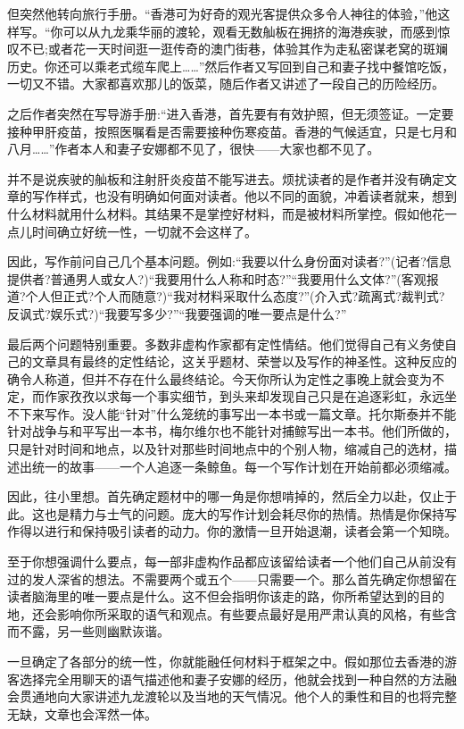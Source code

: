 但突然他转向旅行手册。“香港可为好奇的观光客提供众多令人神往的体验，”他这样写。“你可以从九龙乘华丽的渡轮，观看无数舢板在拥挤的海港疾驶，而感到惊叹不已;或者花一天时间逛一逛传奇的澳门街巷，体验其作为走私密谋老窝的斑斓历史。你还可以乘老式缆车爬上……”然后作者又写回到自己和妻子找中餐馆吃饭，一切又不错。大家都喜欢那儿的饭菜，随后作者又讲述了一段自己的历险经历。

之后作者突然在写导游手册:“进入香港，首先要有有效护照，但无须签证。一定要接种甲肝疫苗，按照医嘱看是否需要接种伤寒疫苗。香港的气候适宜，只是七月和八月……”作者本人和妻子安娜都不见了，很快——大家也都不见了。

并不是说疾驶的舢板和注射肝炎疫苗不能写进去。烦扰读者的是作者并没有确定文章的写作样式，也没有明确如何面对读者。他以不同的面貌，冲着读者就来，想到什么材料就用什么材料。其结果不是掌控好材料，而是被材料所掌控。假如他花一点儿时间确立好统一性，一切就不会这样了。

因此，写作前问自己几个基本问题。例如:“我要以什么身份面对读者?”(记者?信息提供者?普通男人或女人?)“我要用什么人称和时态?”“我要用什么文体?”(客观报道?个人但正式?个人而随意?)“我对材料采取什么态度?”(介入式?疏离式?裁判式?反讽式?娱乐式?)“我要写多少?”“我要强调的唯一要点是什么?”

最后两个问题特别重要。多数非虚构作家都有定性情结。他们觉得自己有义务使自己的文章具有最终的定性结论，这关乎题材、荣誉以及写作的神圣性。这种反应的确令人称道，但并不存在什么最终结论。今天你所认为定性之事晚上就会变为不定，而作家孜孜以求每一个事实细节，到头来却发现自己只是在追逐彩虹，永远坐不下来写作。没人能“针对”什么笼统的事写出一本书或一篇文章。托尔斯泰并不能针对战争与和平写出一本书，梅尔维尔也不能针对捕鲸写出一本书。他们所做的，只是针对时间和地点，以及针对那些时间地点中的个别人物，缩减自己的选材，描述出统一的故事——一个人追逐一条鲸鱼。每一个写作计划在开始前都必须缩减。

因此，往小里想。首先确定题材中的哪一角是你想啃掉的，然后全力以赴，仅止于此。这也是精力与士气的问题。庞大的写作计划会耗尽你的热情。热情是你保持写作得以进行和保持吸引读者的动力。你的激情一旦开始退潮，读者会第一个知晓。

至于你想强调什么要点，每一部非虚构作品都应该留给读者一个他们自己从前没有过的发人深省的想法。不需要两个或五个——只需要一个。那么首先确定你想留在读者脑海里的唯一要点是什么。这不但会指明你该走的路，你所希望达到的目的地，还会影响你所采取的语气和观点。有些要点最好是用严肃认真的风格，有些含而不露，另一些则幽默诙谐。

一旦确定了各部分的统一性，你就能融任何材料于框架之中。假如那位去香港的游客选择完全用聊天的语气描述他和妻子安娜的经历，他就会找到一种自然的方法融会贯通地向大家讲述九龙渡轮以及当地的天气情况。他个人的秉性和目的也将完整无缺，文章也会浑然一体。

